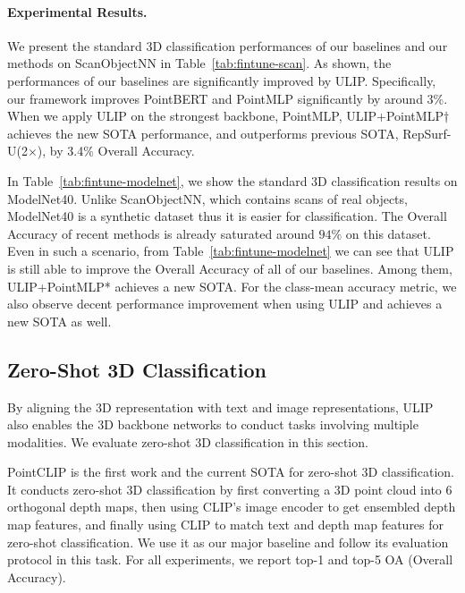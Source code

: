 \vspace{-10pt}
\paragraph{Experimental Results.}
We present the standard 3D classification performances of our baselines and our methods on ScanObjectNN in Table~\ref{tab:fintune-scan}. As shown, the performances of our baselines are significantly improved by ULIP. Specifically, our framework improves PointBERT and PointMLP significantly by around 3\%.
When we apply ULIP on the strongest backbone, PointMLP, ULIP+PointMLP$\dag$ achieves the new SOTA performance, and outperforms previous SOTA, RepSurf-U(2$\times$), by 3.4\% Overall Accuracy. 

In Table~\ref{tab:fintune-modelnet}, we show the standard 3D classification results on ModelNet40.
Unlike ScanObjectNN, which contains scans of real objects, ModelNet40 is a synthetic dataset thus it is easier for classification. The Overall Accuracy of recent methods is already saturated around $94\%$ on this dataset.
Even in such a scenario, from Table~\ref{tab:fintune-modelnet} we can see that ULIP is still able to improve the Overall Accuracy of all of our baselines. Among them, ULIP+PointMLP* achieves a new SOTA.
For the class-mean accuracy metric, we also observe decent performance improvement when using ULIP and achieves a new SOTA as well.

\subsection{Zero-Shot 3D Classification}
By aligning the 3D representation with text and image representations, ULIP also enables the 3D backbone networks to conduct tasks involving multiple modalities. We evaluate zero-shot 3D classification in this section.

PointCLIP is the first work and the current SOTA for zero-shot 3D classification. It conducts zero-shot 3D classification by first converting a 3D point cloud into 6 orthogonal depth maps, then using CLIP's image encoder to get ensembled depth map features, and finally using CLIP to match text and depth map features for zero-shot classification. We use it as our major baseline and follow its evaluation protocol in this task. For all experiments, we report top-1 and top-5 OA (Overall Accuracy).

